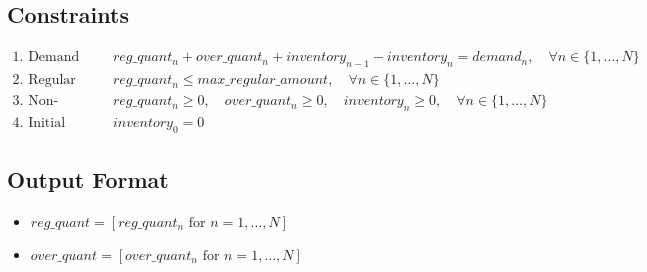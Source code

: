 \documentclass{article}
\begin{document}
\subsection*{Constraints}
\begin{align*}
    \text{1. Demand Satisfaction:} & \quad reg\_quant_n + over\_quant_n + inventory_{n-1} - inventory_n = demand_n, \quad \forall n \in \{1, \ldots, N\} \\
    \text{2. Regular Production Limit:} & \quad reg\_quant_n \leq max\_regular\_amount, \quad \forall n \in \{1, \ldots, N\} \\
    \text{3. Non-negativity Constraints:} & \quad reg\_quant_n \geq 0, \quad over\_quant_n \geq 0, \quad inventory_n \geq 0, \quad \forall n \in \{1, \ldots, N\} \\
    \text{4. Initial Inventory:} & \quad inventory_0 = 0
\end{align*}

\subsection*{Output Format}
\begin{itemize}
    \item \( reg\_quant = [reg\_quant_n \text{ for } n = 1,\ldots,N] \)
    \item \( over\_quant = [over\_quant_n \text{ for } n = 1,\ldots,N] \)
\end{itemize}
\end{document}
